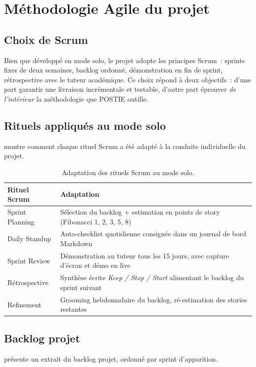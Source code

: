 \chapter{Méthodologie Agile du projet}
\label{ch:agile}

\section{Choix de Scrum}
Bien que développé en mode solo, le projet adopte les principes Scrum~:
sprints fixes de deux semaines, backlog ordonné, démonstration en fin
de sprint, rétrospective avec le tuteur académique. Ce choix répond à
deux objectifs~: d'une part garantir une livraison incrémentale et
testable, d'autre part éprouver \emph{de l'intérieur} la méthodologie
que POSTIE outille.

\section{Rituels appliqués au mode solo}
 montre comment chaque rituel Scrum a été adapté à
la conduite individuelle du projet.

\begin{table}[H]\centering
\caption{Adaptation des rituels Scrum au mode solo.}
\label{tab:rituels}
\begin{tabularx}{\linewidth}{lX}
\toprule
\textbf{Rituel Scrum} & \textbf{Adaptation}\\
\midrule
Sprint Planning & Sélection du backlog + estimation en points
                  de story (Fibonacci 1, 2, 3, 5, 8)\\
Daily Standup   & Auto-checklist quotidienne consignée dans un
                  journal de bord Markdown\\
Sprint Review   & Démonstration au tuteur tous les 15 jours,
                  avec capture d'écran et démo en live\\
Rétrospective   & Synthèse écrite \emph{Keep / Stop / Start}
                  alimentant le backlog du sprint suivant\\
Refinement      & Grooming hebdomadaire du backlog, ré-estimation
                  des stories restantes\\
\bottomrule
\end{tabularx}
\end{table}

\section{Backlog projet}
 présente un extrait du backlog projet, ordonné
par sprint d'apparition.

